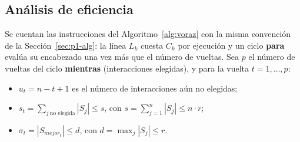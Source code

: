 \documentclass[11pt,a4paper]{article}
\theoremstyle{definition}
\begin{document}
\subsection{Análisis de eficiencia}\label{sec:p2-ef}

Se cuentan las instrucciones del Algoritmo~\ref{alg:voraz} con la misma convención de la Sección~\ref{sec:p1-alg}: la línea $L_k$ cuesta $C_k$ por ejecución y un ciclo \textbf{para} evalúa su encabezado una vez más que el número de vueltas. Sea $p$ el número de vueltas del ciclo \textbf{mientras} (interacciones elegidas), y para la vuelta $t=1,\dots,p$:
\begin{itemize}[nosep]
  \item $u_t=n-t+1$ es el número de interacciones aún no elegidas;
  \item $s_t=\sum_{j\ \text{no elegida}}|S_j|\le s$, con $s=\sum_{j=1}^{n}|S_j|\le n\cdot r$;
  \item $\sigma_t=|S_{mejor_t}|\le d$, con $d=\max_j|S_j|\le r$.
\end{itemize}
\end{document}
